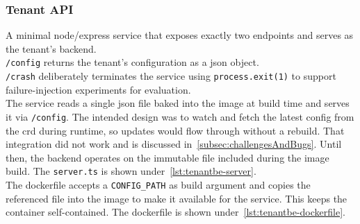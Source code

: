 \documentclass[11pt, a4paper, oneside, listof=totoc]{scrartcl}
\begin{document}
            \subsubsection{Tenant API}\label{subsubsec:tenantAPI}
                A minimal \gls{node}/\gls{express} service that exposes exactly two endpoints and serves as
                the tenant's backend.\\
                \texttt{/config} returns the tenant's configuration as a \gls{json} object.\\
                \texttt{/crash} deliberately terminates the service using
                \texttt{process.exit(1)} to support failure-injection experiments for evaluation.\\%
                The service reads a single \gls{json} file baked into the image at build time and
                serves it via \texttt{/config}.
                The intended design was to watch and fetch the latest config from the \gls{crd}
                during runtime, so updates would flow through without a rebuild.
                That integration did not work and is discussed in~\autoref{subsec:challengesAndBugs}.
                Until then, the backend operates on the immutable file included during the image
                build.
                The \texttt{server.ts} is shown under~\autoref{lst:tenantbe-server}.\\
                The dockerfile accepts a \texttt{CONFIG\_PATH} as build argument and copies the
                referenced file into the image to make it available for the service.
                This keeps the container self-contained.
                The dockerfile is shown under~\autoref{lst:tenantbe-dockerfile}.
\end{document}
